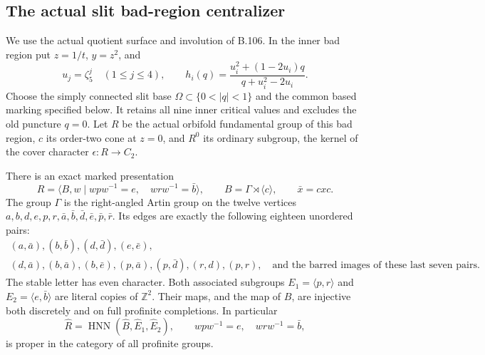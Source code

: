 \subsection*{The actual slit bad-region centralizer}

\label{stmt:B110}
We use the actual quotient surface and involution of B.106. In the
inner bad region put $z=1/t$, $y=z^2$, and
\[
 u_j=\zeta_5^j\quad(1\leq j\leq4),\qquad
 h_i(q)=\frac{u_i^2+(1-2u_i)q}{q+u_i^2-2u_i}.
\]
Choose the simply connected slit base $\Omega\subset\{0<|q|<1\}$
and the common based marking specified below. It retains all nine
inner critical values and excludes the old puncture $q=0$.
Let $R$ be the actual orbifold fundamental group of this bad region,
$c$ its order-two cone at $z=0$, and $R^0$ its ordinary subgroup,
the kernel of the cover character $\epsilon:R\to C_2$.

There is an exact marked presentation
\begin{equation}\label{eq:B110-HNN}
 R=\langle B,w\mid wpw^{-1}=e,\quad wrw^{-1}=\bar b\rangle,
 \qquad B=\Gamma\rtimes\langle c\rangle,
 \qquad \bar x=cxc.
\end{equation}
The group $\Gamma$ is the right-angled Artin group on the twelve
vertices $a,b,d,e,p,r,\bar a,\bar b,\bar d,\bar e,\bar p,\bar r$.
Its edges are exactly the following eighteen unordered pairs:
\begin{equation}\label{eq:B110-edges}
 \begin{gathered}
 (a,\bar a),(b,\bar b),(d,\bar d),(e,\bar e),\\
 (d,\bar a),(b,\bar a),(b,\bar e),
 (p,\bar a),(p,\bar d),(r,d),(p,r),
 \quad\text{and the barred images of these last seven pairs}.
 \end{gathered}
\end{equation}
The stable letter has even character. Both associated subgroups
$E_1=\langle p,r\rangle$ and $E_2=\langle e,\bar b\rangle$ are
literal copies of $\mathbb Z^2$. Their maps, and the map of $B$, are
injective both discretely and on full profinite completions. In particular
\[
 \widehat R=\operatorname{HNN}
 (\widehat B,\widehat E_1,\widehat E_2),
 \qquad wpw^{-1}=e,\quad wrw^{-1}=\bar b,
\]
is proper in the category of all profinite groups.

